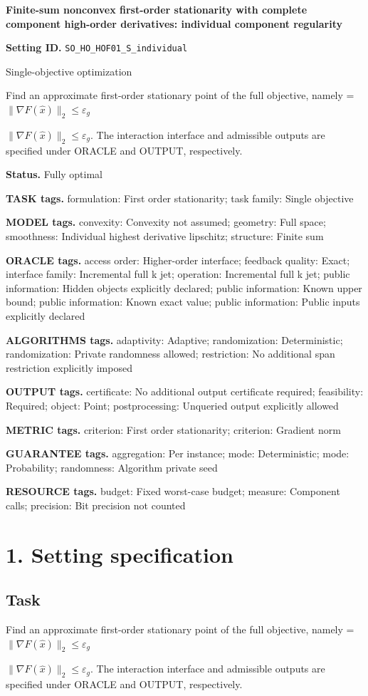 \documentclass[10pt,a4paper]{article}
\newcommand{\AtlasMath}[1]{\par\begingroup\centering\setbox0=\hbox{$\displaystyle #1$}\ifdim\wd0>1.4\linewidth\typeout{ATLAS WIDE FORMULA: \the\wd0}\fi\ifdim\wd0>\linewidth\resizebox{\linewidth}{!}{\box0}\else\box0\fi\par\endgroup}
\newcommand{\AtlasInlineMath}[1]{\begingroup\setbox0=\hbox{$#1$}\ifdim\wd0>.4\linewidth\endgroup\AtlasMath{#1}\else\endgroup$#1$\fi}
\begin{document}
\raggedright

{\LARGE\bfseries\sffamily\color{AtlasNavy} Finite-sum nonconvex first-order stationarity with complete component high-order derivatives: individual component regularity\par}\vspace{5pt}
\textbf{Setting ID.} \texttt{SO\_\allowbreak{}HO\_\allowbreak{}HOF01\_\allowbreak{}S\_\allowbreak{}individual}

Single-objective optimization

Find an approximate first-order stationary point of the full objective, namely \AtlasInlineMath{\|\nabla F(\widehat{x})\|_2\le\varepsilon_g}. The interaction interface and admissible outputs are specified under ORACLE and OUTPUT, respectively.

\textbf{Status.} Fully optimal

\textbf{TASK tags.} formulation: First order stationarity; task family: Single objective

\textbf{MODEL tags.} convexity: Convexity not assumed; geometry: Full space; smoothness: Individual highest derivative lipschitz; structure: Finite sum

\textbf{ORACLE tags.} access order: Higher-order interface; feedback quality: Exact; interface family: Incremental full k jet; operation: Incremental full k jet; public information: Hidden objects explicitly declared; public information: Known upper bound; public information: Known exact value; public information: Public inputs explicitly declared

\textbf{ALGORITHMS tags.} adaptivity: Adaptive; randomization: Deterministic; randomization: Private randomness allowed; restriction: No additional span restriction explicitly imposed

\textbf{OUTPUT tags.} certificate: No additional output certificate required; feasibility: Required; object: Point; postprocessing: Unqueried output explicitly allowed

\textbf{METRIC tags.} criterion: First order stationarity; criterion: Gradient norm

\textbf{GUARANTEE tags.} aggregation: Per instance; mode: Deterministic; mode: Probability; randomness: Algorithm private seed

\textbf{RESOURCE tags.} budget: Fixed worst-case budget; measure: Component calls; precision: Bit precision not counted

\section{1. Setting specification}
\subsection{Task}
Find an approximate first-order stationary point of the full objective, namely \AtlasInlineMath{\|\nabla F(\widehat{x})\|_2\le\varepsilon_g}. The interaction interface and admissible outputs are specified under ORACLE and OUTPUT, respectively.
\end{document}
